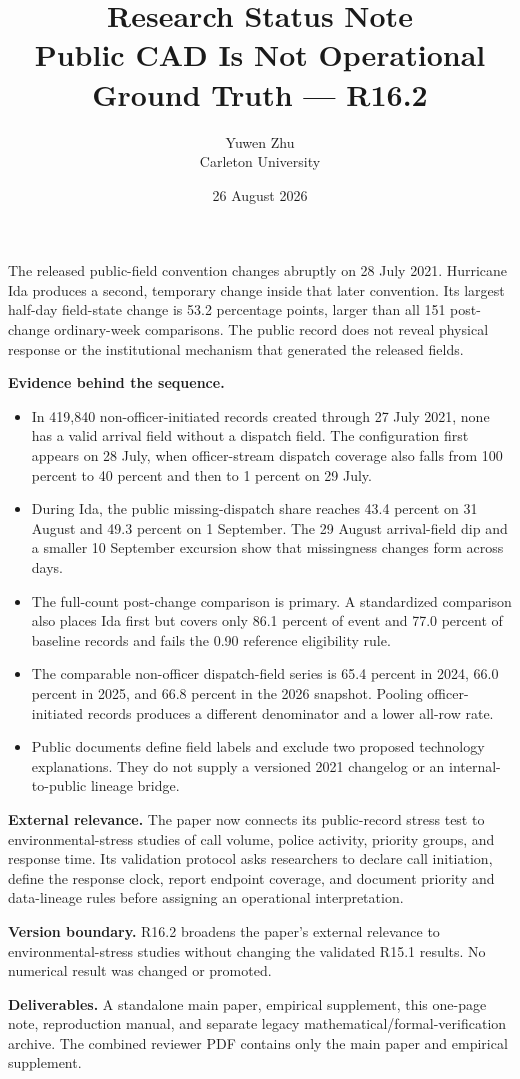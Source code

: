 \documentclass[10pt]{article}
\title{\vspace{-2.2em}\textbf{Research Status Note}\\[0.25em]
\large Public CAD Is Not Operational Ground Truth --- R16.2}
\author{Yuwen Zhu\\Carleton University}
\date{26 August 2026}
\begin{document}
\maketitle
\thispagestyle{plain}
\vspace{-1.9em}

\begin{plainbox}[title=Four findings to retain]
The released public-field convention changes abruptly on 28 July 2021. Hurricane Ida produces a second, temporary change inside that later convention. Its largest half-day field-state change is 53.2 percentage points, larger than all 151 post-change ordinary-week comparisons. The public record does not reveal physical response or the institutional mechanism that generated the released fields.
\end{plainbox}

\noindent\textbf{Evidence behind the sequence.}
\begin{itemize}
\item In 419,840 non-officer-initiated records created through 27 July 2021, none has a valid arrival field without a dispatch field. The configuration first appears on 28 July, when officer-stream dispatch coverage also falls from 100 percent to 40 percent and then to 1 percent on 29 July.
\item During Ida, the public missing-dispatch share reaches 43.4 percent on 31 August and 49.3 percent on 1 September. The 29 August arrival-field dip and a smaller 10 September excursion show that missingness changes form across days.
\item The full-count post-change comparison is primary. A standardized comparison also places Ida first but covers only 86.1 percent of event and 77.0 percent of baseline records and fails the 0.90 reference eligibility rule.
\item The comparable non-officer dispatch-field series is 65.4 percent in 2024, 66.0 percent in 2025, and 66.8 percent in the 2026 snapshot. Pooling officer-initiated records produces a different denominator and a lower all-row rate.
\item Public documents define field labels and exclude two proposed technology explanations. They do not supply a versioned 2021 changelog or an internal-to-public lineage bridge.
\end{itemize}

\noindent\textbf{External relevance.} The paper now connects its public-record stress test to environmental-stress studies of call volume, police activity, priority groups, and response time. Its validation protocol asks researchers to declare call initiation, define the response clock, report endpoint coverage, and document priority and data-lineage rules before assigning an operational interpretation.

\noindent\textbf{Version boundary.} R16.2 broadens the paper's external relevance to environmental-stress studies without changing the validated R15.1 results. No numerical result was changed or promoted.

\noindent\textbf{Deliverables.} A standalone main paper, empirical supplement, this one-page note, reproduction manual, and separate legacy mathematical/formal-verification archive. The combined reviewer PDF contains only the main paper and empirical supplement.
\end{document}
